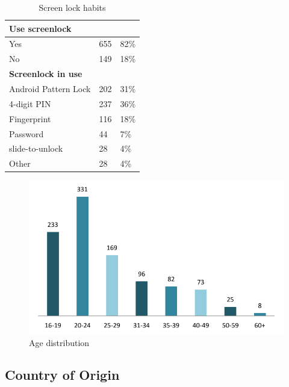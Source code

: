 \begin{table}[H]
{\begin{tabular}{ l | l l }
          \multicolumn{3}{l}{\bf Use screenlock} \\ \hline
          Yes & 655 & 82\% \\
          No & 149 & 18\% \\ \hline

          \multicolumn{3}{l}{\bf Screenlock in use} \\ \hline
          Android Pattern Lock & 202 & 31\% \\
          4-digit PIN & 237 & 36\% \\
          Fingerprint & 116 & 18\% \\
          Password & 44 & 7\% \\
          slide-to-unlock & 28 & 4\% \\
          Other & 28 & 4\% \\ \hline
        \end{tabular}
        \caption{Screen lock habits}
        \label{tab:screenlockHabits}
      }
    \end{table}

    {\bf \color{red}{Note to self: oppdatere "under 20" som egentlig er 85 og oppdatere tall på hvor mange som er ukjente}}

    \begin{figure}[H]
      \centering
      \includegraphics[scale=0.8]{pics/analysis/AgeDist.png}
      \caption{Age distribution}
      \label{fig:ageDistribution}
    \end{figure}

  \clearpage
	\subsection{Country of Origin} \label{sec:countryoforigin}


